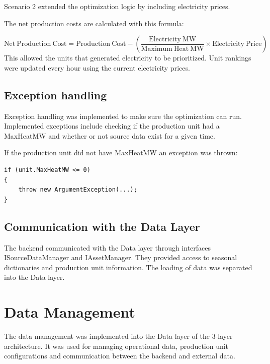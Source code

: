 Scenario 2 extended the optimization logic by including electricity prices.

\noindent \newline The net production costs are calculated with this formula:

\begin{equation}
\mathrm{Net\ Production\ Cost} =
\mathrm{Production\ Cost} -
\left(
\frac{\mathrm{Electricity\ MW}}
{\mathrm{Maximum\ Heat\ MW}}
\times
\mathrm{Electricity\ Price}
\right)
\end{equation}
This allowed the units that generated electricity to be prioritized. Unit rankings were updated every hour using the current electricity prices.

\subsection{Exception handling}

Exception handling was implemented to make sure the optimization can run.
Implemented exceptions include checking if the production unit had a MaxHeatMW and whether or not source data exist for a given time.


\noindent \newline If the production unit did not have MaxHeatMW an exception was thrown:

\begin{verbatim}
if (unit.MaxHeatMW <= 0)
{
    throw new ArgumentException(...);
}
\end{verbatim}


\subsection{Communication with the Data Layer}

The backend communicated with the Data layer through interfaces ISourceDataManager and IAssetManager.
They provided access to seasonal dictionaries and production unit information.
The loading of data was separated into the Data layer. 


\section{Data Management}

The data management was implemented into the Data layer of the 3-layer architecture. It was used for managing operational data, production unit configurations and communication between the backend and external data.

